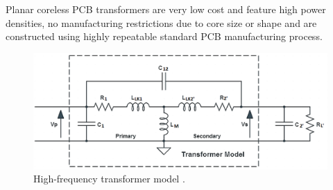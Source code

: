 \documentclass[conference]{IEEEtran}
\begin{document}
Planar coreless PCB transformers are very low cost and feature high power densities, no manufacturing restrictions due to core size or shape and are constructed using highly repeatable standard PCB manufacturing process. 

\begin{figure}[t]
	\centering
	\includegraphics[width=1\columnwidth]{./img/HF_Model}
	\caption{High-frequency transformer model \cite{TangHuiFundamental}.}
	\label{fig:HF-Model}
\end{figure}
\end{document}
